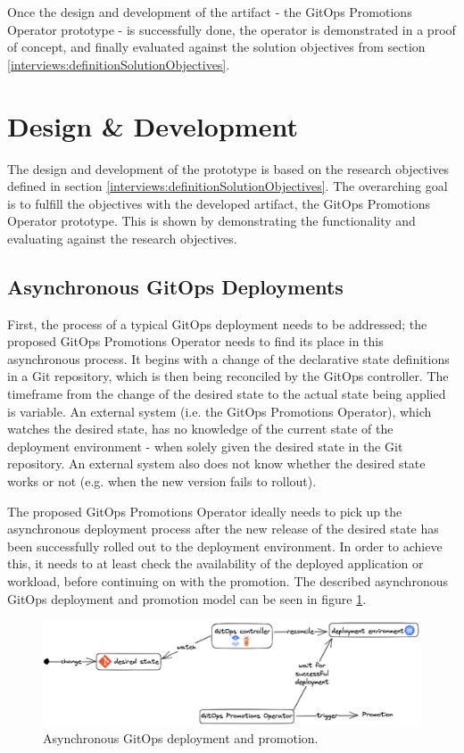 Once the design and development of the artifact - the GitOps Promotions Operator prototype -
is successfully done,
the operator is demonstrated in a proof of concept,
and finally evaluated against the solution objectives
from section \ref{interviews:definitionSolutionObjectives}.

\section{Design \& Development}

The design and development of the prototype
is based on the research objectives defined in section
\ref{interviews:definitionSolutionObjectives}.
The overarching goal is to fulfill the objectives with the developed artifact,
the GitOps Promotions Operator prototype.
This is shown by demonstrating the functionality and evaluating against the research objectives.

\subsection{Asynchronous GitOps Deployments}

First, the process of a typical GitOps deployment needs to be addressed;
the proposed GitOps Promotions Operator needs to find its place in this asynchronous process.
It begins with a change of the declarative state definitions in a Git repository,
which is then being reconciled by the GitOps controller.
The timeframe from the change of the desired state to the actual state being applied
is variable. An external system (i.e. the GitOps Promotions Operator), which watches the desired state, has no knowledge of
the current state of the deployment environment - when solely given the desired state in the
Git repository. An external system also does not know whether the desired state works or not
(e.g. when the new version fails to rollout).

The proposed GitOps Promotions Operator ideally needs to pick up
the asynchronous deployment process after the new release of the desired state
has been successfully rolled out to the deployment environment.
In order to achieve this,
it needs to at least check the availability of the deployed application or workload,
before continuing on with the promotion.
The described asynchronous GitOps deployment and promotion model can be seen in figure
\ref{fig:async-gitops-promo-arch}.

\begin{figure}[h]
	\centering
	\includegraphics[width=1.00\linewidth]{assets/async-gitops-promo-arch.png}
	\caption{Asynchronous GitOps deployment and promotion.
	}
	\label{fig:async-gitops-promo-arch}	
\end{figure}

